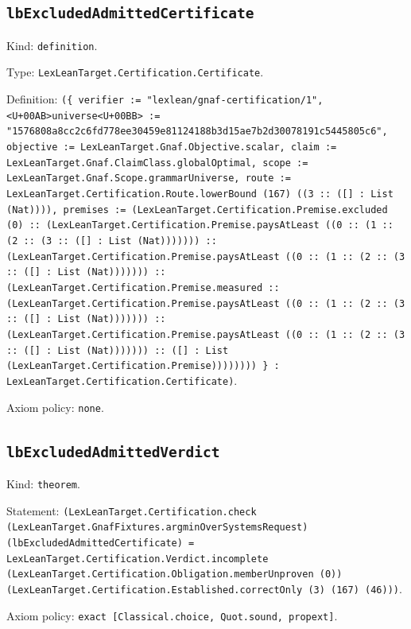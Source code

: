 \documentclass[11pt]{article}
\begin{document}
\subsection*{\texttt{lbExcludedAdmittedCertificate}}
\noindent Kind: \texttt{definition}.\par
\noindent Type: \texttt{LexLeanTarget.Certification.Certificate}.\par
\noindent Definition: \texttt{(\{ verifier := "lexlean/gnaf-certification/1", <U+00AB>universe<U+00BB> := "1576808a8cc2c6fd778ee30459e81124188b3d15ae7b2d30078191c5445805c6", objective := LexLeanTarget.Gnaf.Objective.scalar, claim := LexLeanTarget.Gnaf.ClaimClass.globalOptimal, scope := LexLeanTarget.Gnaf.Scope.grammarUniverse, route := LexLeanTarget.Certification.Route.lowerBound (167) ((3 :: ([] : List (Nat)))), premises := (LexLeanTarget.Certification.Premise.excluded (0) :: (LexLeanTarget.Certification.Premise.paysAtLeast ((0 :: (1 :: (2 :: (3 :: ([] : List (Nat))))))) :: (LexLeanTarget.Certification.Premise.paysAtLeast ((0 :: (1 :: (2 :: (3 :: ([] : List (Nat))))))) :: (LexLeanTarget.Certification.Premise.measured :: (LexLeanTarget.Certification.Premise.paysAtLeast ((0 :: (1 :: (2 :: (3 :: ([] : List (Nat))))))) :: (LexLeanTarget.Certification.Premise.paysAtLeast ((0 :: (1 :: (2 :: (3 :: ([] : List (Nat))))))) :: ([] : List (LexLeanTarget.Certification.Premise)))))))) \} : LexLeanTarget.Certification.Certificate)}.\par
\noindent Axiom policy: \texttt{none}.\par
\subsection*{\texttt{lbExcludedAdmittedVerdict}}
\noindent Kind: \texttt{theorem}.\par
\noindent Statement: \texttt{(LexLeanTarget.Certification.check (LexLeanTarget.GnafFixtures.argminOverSystemsRequest) (lbExcludedAdmittedCertificate) = LexLeanTarget.Certification.Verdict.incomplete (LexLeanTarget.Certification.Obligation.memberUnproven (0)) (LexLeanTarget.Certification.Established.correctOnly (3) (167) (46)))}.\par
\noindent Axiom policy: \texttt{exact [Classical.choice, Quot.sound, propext]}.\par
\end{document}
